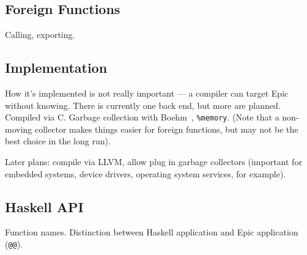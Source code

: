 \subsection{Foreign Functions}

Calling, exporting.

\subsection{Implementation}

How it's implemented is not really important --- a compiler can target
Epic without knowing. There is currently one back end, but more are
planned. Compiled via C. Garbage collection with
Boehm~\cite{boehm-gc}, \texttt{\%memory}. (Note that a non-moving
collector makes things easier for foreign functions, but may not be
the best choice in the long run).

Later plans: compile via LLVM, allow plug in garbage collectors
(important for embedded systems, device drivers, operating system
services, for example).

\subsection{Haskell API}

Function names. Distinction between Haskell application and Epic
application (\texttt{@@}).
